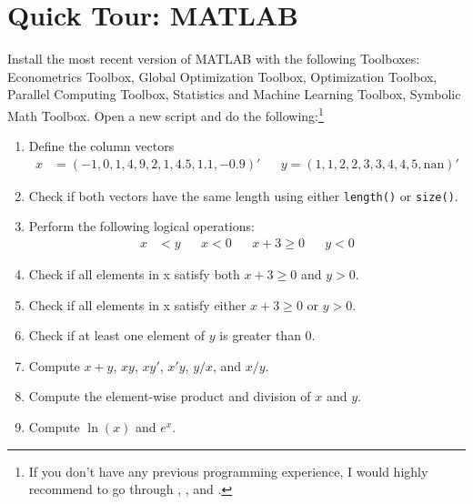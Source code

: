 \section[Quick Tour: MATLAB]{Quick Tour: MATLAB\label{ex:QuickTourMATLAB}}
Install the most recent version of MATLAB with the following Toolboxes:
  Econometrics Toolbox,
  Global Optimization Toolbox,
  Optimization Toolbox,
  Parallel Computing Toolbox,
  Statistics and Machine Learning Toolbox,
  Symbolic Math Toolbox.
Open a new script and do the following:\footnote{%
  If you don't have any previous programming experience,
  I would highly recommend to go through
  \textcite[Appendix A]{Brandimarte_2006_NumericalMethodsFinance},
  \textcite[Appendix B]{Miranda.Fackler_2002_AppliedComputationalEconomics},
  and \textcite{Pfeifer_2017_MATLABHandout}.
}

\begin{enumerate}

\item
Define the column vectors
\begin{align*}
x &= \left(-1,0,1,4,9,2,1,4.5,1.1,-0.9\right)' && y =\left(1,1,2,2,3,3,4,4,5,\text{nan}\right)'
\end{align*}

\item
Check if both vectors have the same length using either \texttt{length{()}} or \texttt{size{()}}.

\item
Perform the following logical operations:
\begin{align*}
x&<y && x<0 && x+3\geq0 && y<0
\end{align*}

\item
Check if all elements in x satisfy both \(x + 3 \geq 0\) and \(y > 0\).

\item
Check if all elements in x satisfy either \(x + 3 \geq 0\) or \(y > 0\).

\item
Check if at least one element of \(y\) is greater than \(0\).

\item
Compute \(x+y\), \(xy\), \(xy'\), \(x'y\), \(y/x\), and \(x/y\).

\item
Compute the element-wise product and division of \(x\) and \(y\).

\item
Compute \(\ln(x)\) and \(e^x\).


\end{enumerate}

